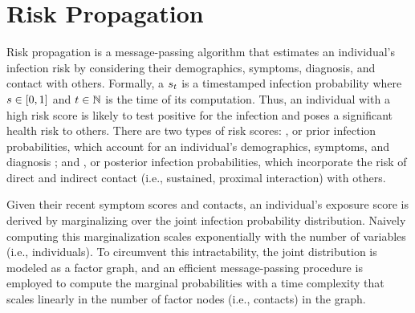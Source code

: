 \chapter{Risk Propagation}

\newcommand{\eventSpace}{\Omega}
\newcommand{\event}{\omega}


Risk propagation is a message-passing algorithm that estimates an individual's infection risk by considering their demographics, symptoms, diagnosis, and contact with others. Formally, a  $s_t$ is a timestamped infection probability where $s \in [0, 1]$ and $t \in \mathbb{N}$ is the time of its computation. Thus, an individual with a high risk score is likely to test positive for the infection and poses a significant health risk to others. There are two types of risk scores: , or prior infection probabilities, which account for an individual's demographics, symptoms, and diagnosis \cite{Menni2020}; and , or posterior infection probabilities, which incorporate the risk of direct and indirect contact (i.e., sustained, proximal interaction) with others.

Given their recent symptom scores and contacts, an individual's exposure score is derived by marginalizing over the joint infection probability distribution. Naively computing this marginalization scales exponentially with the number of variables (i.e., individuals). To circumvent this intractability, the joint distribution is modeled as a factor graph, and an efficient message-passing procedure is employed to compute the marginal probabilities with a time complexity that scales linearly in the number of factor nodes (i.e., contacts) in the graph.

